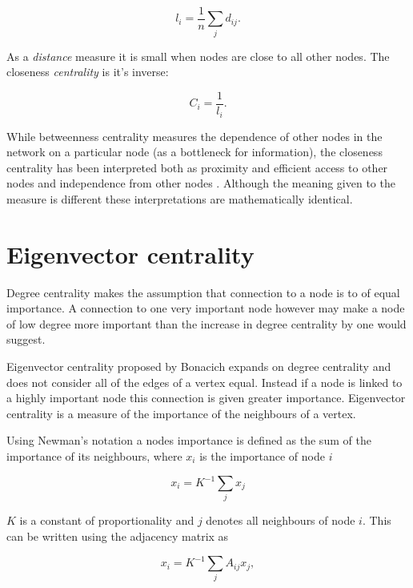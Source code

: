 \begin{equation}
    l_i = \frac{1}{n} \sum_j d_{ij}.
\end{equation}

 As a \textit{distance} measure it is small when nodes are close to all other nodes. The closeness \textit{centrality} is it's inverse:


\begin{equation}
    C_i = \frac{1}{l_i}. 
\end{equation}
\cite{newman2018networks}

While betweenness centrality measures the dependence of other nodes in the network on a particular node (as a bottleneck for information), the closeness centrality has been interpreted both as proximity and efficient access to other nodes and independence from other nodes \cite{brandes2016maintaining}. Although the meaning given to the measure is different these interpretations are mathematically identical.



\section{Eigenvector centrality}
Degree centrality makes the assumption that connection to a node is  to of equal importance.  A connection to one very important node however may make a node of low degree more important than the increase in degree centrality by one would suggest. 

Eigenvector centrality proposed by Bonacich \cite{bonacich1972factoring} expands on degree centrality and does not consider all of the edges of a vertex equal. Instead if a node is linked to a highly important node this connection is given greater importance. Eigenvector centrality is a measure of the importance of the neighbours of a vertex.

Using Newman's notation \cite{newman2018networks} a nodes importance is defined as the sum of the importance of its neighbours, where $x_i$ is the importance of node $i$

\begin{equation}
    x_i = K^{-1} \sum_j x_j
\end{equation}

$K$ is a constant of proportionality and $j$ denotes all neighbours of node $i$. This can be written using the adjacency matrix as

\begin{equation}
    x_i = K^{-1} \sum_j A_{ij} x_j,
\end{equation}

